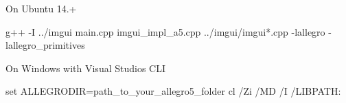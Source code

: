 
\begin{DoxyItemize}
\item On Ubuntu 14.+
\end{DoxyItemize}


\begin{DoxyCode}
g++ -I ../imgui main.cpp imgui\_impl\_a5.cpp ../imgui/imgui*.cpp -lallegro -lallegro\_primitives
\end{DoxyCode}



\begin{DoxyItemize}
\item On Windows with Visual Studio\textquotesingle{}s C\+LI
\end{DoxyItemize}


\begin{DoxyCode}
set ALLEGRODIR=path\_to\_your\_allegro5\_folder
cl /Zi /MD /I %
       /LIBPATH:%
\end{DoxyCode}
 